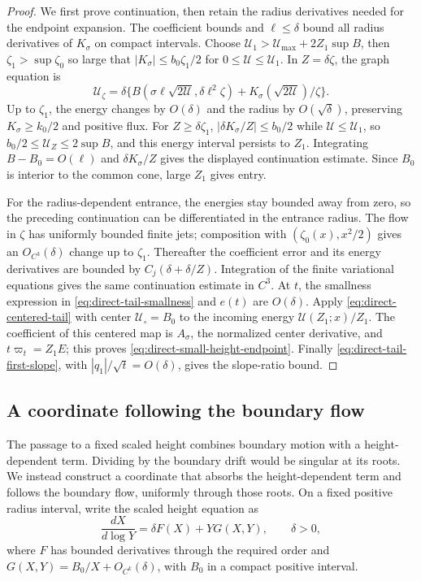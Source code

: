 \begin{proof}
We first prove continuation, then retain the radius derivatives needed
for the endpoint expansion. The coefficient bounds and \(\ell\le\delta\)
bound all radius derivatives
of \(K_\sigma\) on compact intervals. Choose
\(\mathcal U_1>\mathcal U_{\max}+2Z_1\sup B\), then \(\zeta_1>\sup\zeta_0\) so large that
\(|K_\sigma|\le b_0\zeta_1/2\) for \(0\le \mathcal U\le \mathcal U_1\).
In \(Z=\delta\zeta\), the graph equation is
\[
 \mathcal U_\zeta=\delta\{B(\sigma\ell\sqrt{2\mathcal U},\delta\ell^2\zeta)
                       +K_\sigma(\sqrt{2\mathcal U})/\zeta\}.
\]
Up to \(\zeta_1\), the energy changes by \(O(\delta)\) and the radius by
\(O(\sqrt\delta)\), preserving \(K_\sigma\ge k_0/2\) and positive flux.
For \(Z\ge\delta\zeta_1\), \(|\delta K_\sigma/Z|\le b_0/2\) while
\(\mathcal U\le \mathcal U_1\), so \(b_0/2\le \mathcal U_Z\le2\sup B\), and this energy interval
persists to \(Z_1\). Integrating \(B-B_0=O(\ell)\) and
\(\delta K_\sigma/Z\) gives the displayed continuation estimate.
Since \(B_0\) is interior to the common cone, large \(Z_1\) gives entry.

For the radius-dependent entrance, the energies stay bounded away from
zero, so the preceding continuation can be differentiated in the entrance
radius. The flow in \(\zeta\) has uniformly bounded finite jets;
composition with \((\zeta_0(x),x^2/2)\) gives an \(O_{C^3}(\delta)\)
change up to \(\zeta_1\). Thereafter the coefficient error and its energy
derivatives are bounded by \(C_j(\delta+\delta/Z)\). Integration of the
finite variational equations gives the same continuation estimate in
\(C^3\). At \(t\), the smallness expression in
\eqref{eq:direct-tail-smallness} and \(e(t)\) are \(O(\delta)\).
Apply \eqref{eq:direct-centered-tail} with center
\(\mathcal U_\circ=B_0\) to the incoming energy \(\mathcal U(Z_1;x)/Z_1\).
The coefficient of this centered map is \(A_\sigma\), the normalized center derivative,
and \(t\varpi_t=Z_1E\); this proves
\eqref{eq:direct-small-height-endpoint}.
Finally \eqref{eq:direct-tail-first-slope}, with
\(|q_1|/\sqrt t=O(\delta)\), gives the slope-ratio bound.
\end{proof}

\subsection{A coordinate following the boundary flow}

The passage to a fixed scaled height combines boundary motion with a
height-dependent term. Dividing by the boundary drift would be singular
at its roots. We instead construct a coordinate that absorbs the
height-dependent term and follows the boundary flow, uniformly through
those roots. On a fixed positive radius interval, write
the scaled height equation as
\begin{equation}
\label{eq:direct-height-system}
 \frac{dX}{d\log Y}=\delta F(X)+YG(X,Y),\qquad \delta>0,
\end{equation}
where \(F\) has bounded derivatives through the required order and
\(G(X,Y)=B_0/X+O_{C^k}(\delta)\), with \(B_0\) in a compact
positive interval.

